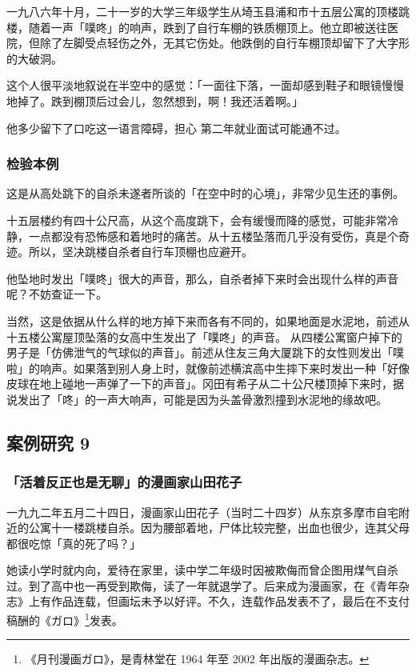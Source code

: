\documentclass[UTF8]{ctexart}
\begin{document}
一九八六年十月，二十一岁的大学三年级学生从埼玉县浦和市十五层公寓的顶楼跳楼，随着一声「噗咚」的响声，跌到了自行车棚的铁质棚顶上。他立即被送往医院，但除了左脚受点轻伤之外，无其它伤处。他跌倒的自行车棚顶却留下了大字形的大破洞。

这个人很平淡地叙说在半空中的感觉：「一面往下落，一面却感到鞋子和眼镜慢慢地掉了。跌到棚顶后过会儿，忽然想到，啊！我还活着啊。」

他多少留下了口吃这一语言障碍，担心 第二年就业面试可能通不过。 

\subsubsection*{检验本例}

这是从高处跳下的自杀未遂者所谈的「在空中时的心境」，非常少见生还的事例。

十五层楼约有四十公尺高，从这个高度跳下，会有缓慢而降的感觉，可能非常冷静，一点都没有恐怖感和着地时的痛苦。从十五楼坠落而几乎没有受伤，真是个奇迹。所以，坚决跳楼自杀者自行车顶棚也应避开。

他坠地时发出「噗咚」很大的声音，那么，自杀者掉下来时会出现什么样的声音呢？不妨查证一下。

当然，这是依据从什么样的地方掉下来而各有不同的，如果地面是水泥地，前述从十五楼公寓屋顶坠落的女高中生发出了「噗咚」的声音。
从四楼公寓窗户掉下的男子是「仿佛泄气的气球似的声音」。前述从住友三角大厦跳下的女性则发出「噗啦」的响声。如果落到别人身上时，就像前述横滨高中生摔下来时发出一种「好像皮球在地上碰地一声弹了一下的声音」。冈田有希子从二十公尺楼顶掉下来时，据说发出了「咚」的一声大响声，可能是因为头盖骨激烈撞到水泥地的缘故吧。

\subsection{案例研究 9}
\subsubsection*{「活着反正也是无聊」的漫画家山田花子}

一九九二年五月二十四日，漫画家山田花子（当时二十四岁）从东京多摩市自宅附近的公寓十一楼跳楼自杀。因为腰部着地，尸体比较完整，出血也很少，连其父母都很吃惊「真的死了吗？」

她读小学时就内向，爱待在家里，读中学二年级时因被欺侮而曾企图用煤气自杀过。到了高中也一再受到欺侮，读了一年就退学了。后来成为漫画家，在《青年杂志》上有作品连载，但画坛未予以好评。不久，连载作品发表不了，最后在不支付稿酬的《ガロ》\footnote{《月刊漫画ガロ》，是青林堂在 1964 年至 2002 年出版的漫画杂志。}发表。
\end{document}
